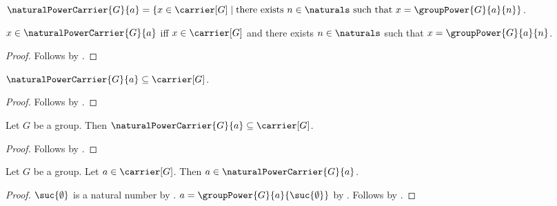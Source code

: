 \begin{definition}\label{natural_power_carrier}
    $\naturalPowerCarrier{G}{a}=
        \{x\in\carrier[G]\mid
            \text{there exists $n\in\naturals$ such that
                $x=\groupPower{G}{a}{n}$}\}$.
\end{definition}

\begin{proposition}\label{natural_power_carrier_iff}
    $x\in\naturalPowerCarrier{G}{a}$ iff
        $x\in\carrier[G]$ and
        there exists $n\in\naturals$ such that
            $x=\groupPower{G}{a}{n}$.
\end{proposition}
\begin{proof}
    Follows by .
\end{proof}

\begin{proposition}\label{natural_power_carrier_subseteq}
    $\naturalPowerCarrier{G}{a}\subseteq\carrier[G]$.
\end{proposition}
\begin{proof}
    Follows by .
\end{proof}

\begin{classification}\label{natural_power_carrier_is_subset_in_group}
    Let $G$ be a group.
    Then $\naturalPowerCarrier{G}{a}\subseteq\carrier[G]$.
\end{classification}
\begin{proof}
    Follows by .
\end{proof}

\begin{proposition}\label{natural_power_carrier_contains_generator}
    Let $G$ be a group.
    Let $a\in\carrier[G]$.
    Then $a\in\naturalPowerCarrier{G}{a}$.
\end{proposition}
\begin{proof}
    $\suc{\emptyset}$ is a natural number by
        .
    $a=\groupPower{G}{a}{\suc{\emptyset}}$ by
        .
    Follows by .
\end{proof}

